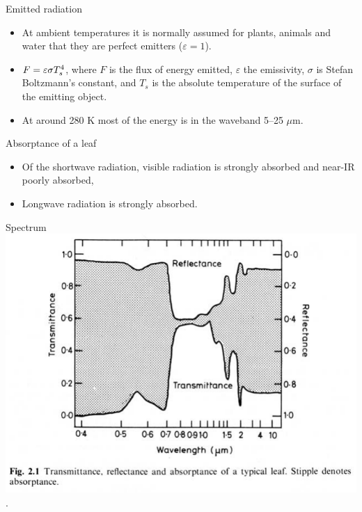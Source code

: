 \documentclass[10pt]{beamer}
\begin{document}
\begin{frame}{Emitted radiation}
    \begin{itemize}
        \item At ambient temperatures it is normally assumed for
        plants, animals and water that they are perfect emitters
        ($\varepsilon=1$).
        \item $\boldmath{F} = \varepsilon \sigma T_s^4$, where $F$
        is the flux of energy emitted, $\varepsilon$ the emissivity, $\sigma$
        is Stefan Boltzmann's constant, and $T_s$ is the absolute
        temperature of the surface of the emitting object.
        \item At around 280 K most of the energy is in the
        waveband 5--25 $\mu$m.
    \end{itemize}
\end{frame}

\begin{frame}{Absorptance of a leaf}
    \begin{itemize}
        \item Of the shortwave radiation, visible radiation is
        strongly absorbed and near-IR poorly absorbed,
        \item Longwave radiation is strongly absorbed.
    \end{itemize}
\end{frame}

\begin{frame}{Spectrum}
    \centering\includegraphics[height=0.7\textheight]{figures/Grace2.1LeafSpectrum}\\
    {\small \autocite[from][]{Grace1983}.}
\end{frame}
\end{document}
